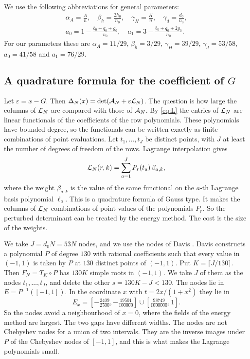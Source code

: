 We use the following abbreviations for general parameters:
\begin{gather*}
 \alpha_A=\frac An,\quad \beta_h=\frac{2h_0}{n_0},\quad \gamma_H=\frac Hn,\quad \gamma_d=\frac{d_0}{n_0},\\
 a_0=1-\frac{b_0+q_0+g_0}{n_0},\quad a_1=3-\frac{b_0+q_0+2g_0}{n_0}.
\end{gather*}
For our parameters these are $\alpha_A=11/29$, $\beta_h=3/29$, $\gamma_H=39/29$, $\gamma_d=53/58$,
$a_0=41/58$ and $a_1=76/29$.

\subsection{A quadrature formula for the coefficient of $G$}\label{ssec:quadrature}
Let $\varepsilon=x-G$. Then $\Delta_N(x)=\det(\mathcal A_N+\varepsilon\mathcal L_N)$. The question is how large the columns
of $\mathcal L_N$ are compared with those of $\mathcal A_N$. By \eqref{eq:L} the entries of $\mathcal L_N$ are linear
functionals of the coefficients of the row polynomials. These polynomials have bounded degree, so the
functionals can be written exactly as finite combinations of point evaluations. Let $t_1,\ldots,t_J$ be
distinct points, with $J$ at least the number of degrees of freedom of the rows. Lagrange interpolation
gives
\begin{equation}\label{eq:quad}
 \mathcal L_N(r,k)=\sum_{a=1}^JP_r(t_a)\,\beta_{a,k},
\end{equation}
where the weight $\beta_{a,k}$ is the value of the same functional on the $a$-th Lagrange basis polynomial
$\ell_a$. This is a quadrature formula of Gauss type. It makes the columns of $\mathcal L_N$ combinations of point
values of the polynomials $P_r$. So the perturbed determinant can be treated by the energy
method. The cost is the size of the weights.

We take $J=d_0N=53N$ nodes, and we use the nodes of Davis \cite{Davis2026}. Davis constructs a polynomial
$P$ of degree $130$ with rational coefficients such that every value in $(-1,1)$ is taken by $P$ at
$130$ distinct points of $(-1,1)$. Put $K=\lceil J/130\rceil$. Then $F_N=T_K\circ P$ has $130K$ simple
roots in $(-1,1)$. We take $J$ of them as the nodes $t_1,\ldots,t_J$, and delete the other $s=130K-J<130$.
The nodes lie in $E=P^{-1}([-1,1])$. In the coordinate $x$ with $t=2x/(1+x^2)$ they lie in
\[
 E_x=[-\tfrac{2409}{2500},-\tfrac{19501}{100000}]\cup[\tfrac{98749}{1000000},1].
\]
So the nodes avoid a neighbourhood of $x=0$, where the fields of the energy method are largest. The two
gaps have different widths. The nodes are not Chebyshev nodes for a union of two intervals. They are the
inverse images under $P$ of the Chebyshev nodes of $[-1,1]$, and this is what makes the Lagrange
polynomials small.

